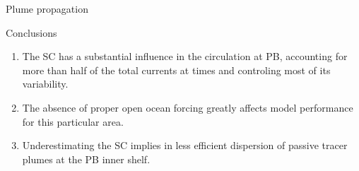 \documentclass[final]{beamer}
\newlength{\onecolwid}
\begin{document}
\begin{frame}[t]
\begin{columns}[t]
\begin{column}{\onecolwid}
\begin{block}{Plume propagation}
    \end{block}


    \begin{alertblock}{Conclusions}

    \begin{small}
    \begin{enumerate}
    \item The SC has a substantial influence in the circulation at PB, accounting for more than half of the total currents at times and controling most of its variability.
    \item The absence of proper open ocean forcing greatly affects model performance for this particular area.
    \item Underestimating the SC implies in less efficient dispersion of passive tracer plumes at the PB inner shelf. 
    \end{enumerate}
    \end{small}

    \end{alertblock}








\end{column}
\end{columns}
\end{frame}
\end{document}
